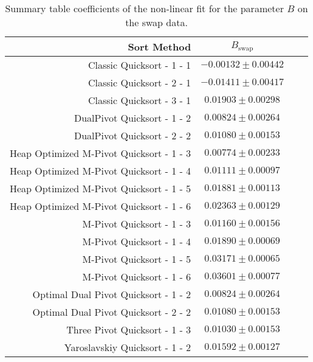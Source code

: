 		\begin{table}
			\begin{center}
				\begin{tabular}{|r|c|c|c}
					\hline
									Sort Method              &   $B_{\text{swap}}$      \\ \hline \hline
					                Classic Quicksort - 1 - 1 &   $ -0.00132 \pm  0.00442$ \\ \hline
					                Classic Quicksort - 2 - 1 &   $ -0.01411 \pm  0.00417$ \\ \hline
					                Classic Quicksort - 3 - 1 &   $  0.01903 \pm  0.00298$ \\ \hline
					              DualPivot Quicksort - 1 - 2 &   $  0.00824 \pm  0.00264$ \\ \hline
					              DualPivot Quicksort - 2 - 2 &   $  0.01080 \pm  0.00153$ \\ \hline
					 Heap Optimized M-Pivot Quicksort - 1 - 3 &   $  0.00774 \pm  0.00233$ \\ \hline
					 Heap Optimized M-Pivot Quicksort - 1 - 4 &   $  0.01111 \pm  0.00097$ \\ \hline
					 Heap Optimized M-Pivot Quicksort - 1 - 5 &   $  0.01881 \pm  0.00113$ \\ \hline
					 Heap Optimized M-Pivot Quicksort - 1 - 6 &   $  0.02363 \pm  0.00129$ \\ \hline
					                M-Pivot Quicksort - 1 - 3 &   $  0.01160 \pm  0.00156$ \\ \hline
					                M-Pivot Quicksort - 1 - 4 &   $  0.01890 \pm  0.00069$ \\ \hline
					                M-Pivot Quicksort - 1 - 5 &   $  0.03171 \pm  0.00065$ \\ \hline
					                M-Pivot Quicksort - 1 - 6 &   $  0.03601 \pm  0.00077$ \\ \hline
					     Optimal Dual Pivot Quicksort - 1 - 2 &   $  0.00824 \pm  0.00264$ \\ \hline
					     Optimal Dual Pivot Quicksort - 2 - 2 &   $  0.01080 \pm  0.00153$ \\ \hline
					            Three Pivot Quicksort - 1 - 3 &   $  0.01030 \pm  0.00153$ \\ \hline
					           Yaroslavskiy Quicksort - 1 - 2 &   $  0.01592 \pm  0.00127$ \\ \hline
				\end{tabular}
				\caption{Summary table coefficients of the non-linear fit for the parameter $B$ on the swap data.}
				\label{tab:swapFitCoeffB}
			\end{center}
		\end{table}

